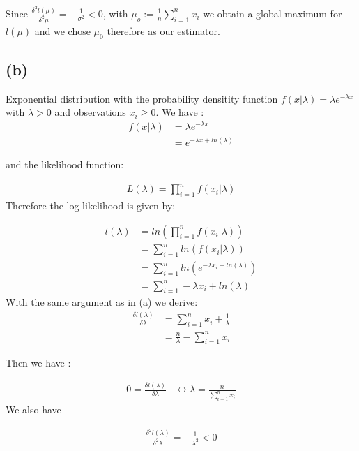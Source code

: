 \documentclass{article}
\begin{document}
Since $\frac{\delta^2 l(\mu)}{\delta^2 \mu} = -\frac{1}{\sigma^2}< 0$, with $\mu_o := \frac{1}{n} \sum_{i=1}^n x_i$ we obtain a global maximum for $l(\mu)$ and we chose $\mu_0$ therefore as our estimator.

\subsection*{(b)}

Exponential distribution with the probability densitity function $f(x|\lambda)= \lambda e^{-\lambda x}$ with $\lambda > 0$ and observations $x_i \geq 0$.
We have :
\begin{align*}
    f(x|\lambda) &= \lambda e^{-\lambda x}\\
                &= e^{-\lambda x +ln(\lambda)}
\end{align*}

and the likelihood function:

\begin{align*}
    L(\lambda)= \prod_{i=1}^n f(x_i | \lambda)
\end{align*}
Therefore the log-likelihood is given by:

\begin{align*}
    l(\lambda)  &= ln(\prod_{i=1}^n f(x_i | \lambda)) \\
                &= \sum_{i=1}^n ln(f(x_i| \lambda))\\
                &= \sum_{i=1}^n ln( e^{-\lambda x_i +ln(\lambda)})\\
                &= \sum_{i=1}^n -\lambda x_i +ln(\lambda)
\end{align*}
With the same argument as in (a) we derive:
\begin{align*}
\frac{\delta l(\lambda)}{\delta \lambda}     &= \sum_{i=1}^n x_i + \frac{1}{\lambda} \\
                                            &= \frac{n}{\lambda} - \sum_{i=1}^n x_i
\end{align*}

Then we have :

\begin{align*}
    0  = \frac{\delta l(\lambda)}{\delta \lambda}    & \leftrightarrow \lambda = \frac{n}{\sum_{i=1}^n x_i}
\end{align*}
We also have 

\begin{align*}
    \frac{\delta^2 l(\lambda)}{\delta^2 \lambda} = -\frac{1}{\lambda^2}<0
\end{align*}
\end{document}
